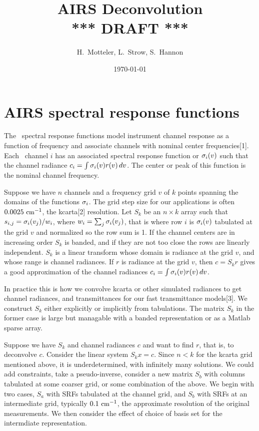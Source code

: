 \documentclass[11pt]{article}
\title{AIRS Deconvolution \\ 
  {***} DRAFT {***}}
\author{H.~Motteler, L.~Strow, S.~Hannon}
\date{\today}
\begin{document}
\maketitle

\section{AIRS spectral response functions}

The \AIRS\ spectral response functions model instrument channel
response as a function of frequency and associate channels with
nominal center frequencies[1].  Each \AIRS\ channel $i$ has an
associated spectral response function or {\SRF} $\sigma_i(v)$ such
that the channel radiance $c_i = \int \sigma_i(v)r(v)\,dv$.  The
center or peak of this function is the nominal channel frequency.

Suppose we have $n$ channels and a frequency grid $v$ of $k$ points
spanning the domains of the functions $\sigma_i$.  The grid step size
for our applications is often $0.0025\ \mbox{\small cm}^{-1}$, the kcarta[2]
resolution.  Let $S_k$ be an $n\times k$ array such that $s_{i,j} =
\sigma_i(v_j)/w_i$, where $w_i = \sum_j \sigma_i(v_j)$, that is where
row $i$ is $\sigma_i(v)$ tabulated at the grid $v$ and normalized so
the row sum is 1.  If the channel centers are in increasing order
$S_k$ is banded, and if they are not too close the rows are linearly
independent.  $S_k$ is a linear transform whose domain is radiance
at the grid $v$, and whose range is channel radiances.  If $r$ is
radiance at the grid $v$, then $c = S_k r$ gives a good
approximation of the channel radiances $c_i = \int\sigma_i(v)r(v)\,dv$.

In practice this is how we convolve kcarta or other simulated
radiances to get {\AIRS} channel radiances, and transmittances 
for our fast transmittance models[3].  We construct $S_k$ either
explicitly or implicitly from {\AIRS} {\SRF} tabulations.  The
matrix $S_k$ in the former case is large but managable with a banded 
representation or as a Matlab sparse array.

Suppose we have $S_k$ and channel radiances $c$ and want to find
$r$, that is, to deconvolve $c$.  Consider the linear system $S_k x
= c$.  Since $n < k$ for the kcarta grid mentioned above, it is
underdetermined, with infinitely many solutions.  We could add
constraints, take a pseudo-inverse, consider a new matrix $S_b$ with
columns tabulated at some coarser grid, or some combination of the
above.  We begin with two cases, $S_a$ with SRFs tabulated at the
{\AIRS} channel grid, and $S_b$ with SRFs at an intermediate grid,
typically $0.1\ \mbox{\small cm}^{-1}$, the approximate resolution of the original
measurements.  We then consider the effect of choice of basis set
for the intermdiate representation.
\end{document}
